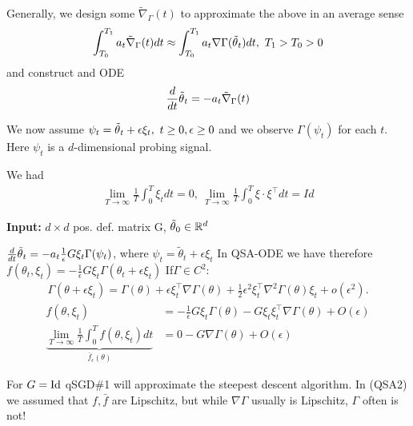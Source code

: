 Generally, we design some \(\tilde{\nabla}_\Gamma(t)\) to approximate the above in an average sense
\[\int_{T_0}^{T_1}a_t\tilde{\nabla}_\Gamma(t)dt \approx \int_{T_0}^{T_1}a_t \nabla\Gamma(\thetatilde_t)dt,\ T_1>T_0>0\]
and construct and ODE 
\begin{equation}
    \frac{d}{dt}{\tilde{\theta}}_t=-a_t\tilde{\nabla}_\Gamma(t)
\end{equation}

We now assume \(\psi_t={\tilde{\theta}}_t+\epsilon \xi_t,\ t\geq 0,\epsilon\geq 0\)
and we observe \(\Gamma(\psi_t)\) for each \(t\). Here \(\psi_t\) is a \(d\)-dimensional probing signal.

We had \begin{align*}
    \lim_{T\to\infty}\frac{1}{T}\int_0^T \xi_t dt=0,\ \lim_{T\to\infty}\frac{1}{T}\int_0^T \xi\cdot \xi^\intercal dt=Id
\end{align*}

\textbf{Input:} \(d\times d\) pos. def. matrix G, \({\tilde{\theta}}_0\in \mathbb{R}^d\)

\(\frac{d}{dt}{\tilde{\theta}}_t=-a_t\frac{1}{\epsilon}G\xi_t\Gamma(\psi_t)\), where \(\psi_t=\tilde{\theta}_t+\epsilon\xi_t\)
In QSA-ODE 
we have therefore \(f(\theta_t,\xi_t)=-\frac{1}{\epsilon}G\xi_t\Gamma(\theta_t+\epsilon\xi_t)\)
If\(\Gamma\in C^2\):
\begin{align*}
    \Gamma(\theta+\epsilon\xi_t)=\Gamma(\theta)+\epsilon\xi_t^\intercal \nabla\Gamma(\theta)+\frac{1}{2}\epsilon^2\xi_t^\intercal\nabla^2 \Gamma(\theta)\xi_t+o(\epsilon^2).
\end{align*}
\begin{align*}
    f(\theta,\xi_t)&=-\frac{1}{\epsilon}G\xi_t\Gamma(\theta)-G \xi_t\xi_t^\intercal\nabla\Gamma(\theta)+O(\epsilon)\\
    \underbrace{\lim_{T\to\infty}\frac{1}{T}\int_0^Tf(\theta,\xi_t)dt}_{\bar{f}_\epsilon(\theta)}&=0-G\nabla\Gamma(\theta)+O(\epsilon) 
\end{align*}


For \(G=\text{Id}\) qSGD\#1 will approximate the steepest descent algorithm. In (QSA2) we assumed that 
\(f, \bar{f}\) are Lipschitz, but while \(\nabla\Gamma\) usually is Lipschitz, \(\Gamma\) often is not!


